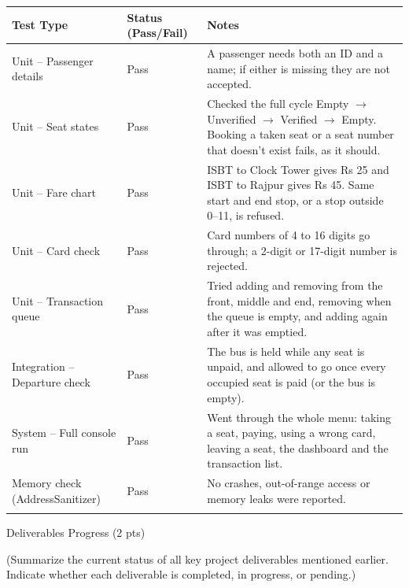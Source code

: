 \documentclass[12pt,a4paper]{article}
\newcommand{\sectiontitle}[1]{%
    {\color{GEUBlue}
    \fontsize{18}{22}\selectfont #1}
}
\newcommand{\instruction}[1]{%
    {\color{InstructionGrey}
    \fontsize{10.5}{13}\selectfont #1}
}
\begin{document}
\begin{tabularx}{\textwidth}{
|>{\raggedright\arraybackslash}p{}
|>{\raggedright\arraybackslash}p{}
|>{\raggedright\arraybackslash}X|
}
\hline
\textbf{Test Type} & \textbf{Status (Pass/Fail)} & \textbf{Notes}\\
\hline
Unit -- Passenger details & Pass & A passenger needs both an ID and a name; if either is missing they are not accepted.\\
\hline
Unit -- Seat states & Pass & Checked the full cycle Empty $\rightarrow$ Unverified $\rightarrow$ Verified $\rightarrow$ Empty. Booking a taken seat or a seat number that doesn't exist fails, as it should.\\
\hline
Unit -- Fare chart & Pass & ISBT to Clock Tower gives Rs 25 and ISBT to Rajpur gives Rs 45. Same start and end stop, or a stop outside 0--11, is refused.\\
\hline
Unit -- Card check & Pass & Card numbers of 4 to 16 digits go through; a 2-digit or 17-digit number is rejected.\\
\hline
Unit -- Transaction queue & Pass & Tried adding and removing from the front, middle and end, removing when the queue is empty, and adding again after it was emptied.\\
\hline
Integration -- Departure check & Pass & The bus is held while any seat is unpaid, and allowed to go once every occupied seat is paid (or the bus is empty).\\
\hline
System -- Full console run & Pass & Went through the whole menu: taking a seat, paying, using a wrong card, leaving a seat, the dashboard and the transaction list.\\
\hline
Memory check (AddressSanitizer) & Pass & No crashes, out-of-range access or memory leaks were reported.\\
\hline
\multicolumn{3}{|l|}{\textbf{Overall:} all 28 checks in \texttt{test/test.cpp} pass.}\\
\hline
\end{tabularx}

\vspace{0.65cm}

\sectiontitle{Deliverables Progress (2 pts)}

\vspace{0.05cm}

\instruction{
(Summarize the current status of all key project deliverables mentioned earlier. Indicate whether each deliverable is
completed, in progress, or pending.)
}
\end{document}
